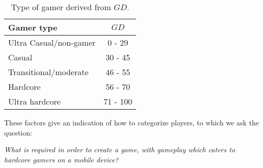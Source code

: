 \begin{table}[H]
\begin{tabular}{|l|c|}
\hline
\rowcolor[HTML]{C0C0C0} 
Gamer type             & $GD$     \\ \hline
Ultra Casual/non-gamer & 0 - 29   \\ \hline
Casual                 & 30 - 45  \\ \hline
Transitional/moderate  & 46 - 55  \\ \hline
Hardcore               & 56 - 70  \\ \hline
Ultra hardcore         & 71 - 100 \\ \hline
\end{tabular}
\caption{Type of gamer derived from $GD$.}
\label{tab:gamertype}
\end{table}

These factors give an indication of how to categorize players, to which we ask the question: 
\begin{center}\label{intro:problem_statement}
\textit{What is required in order to create a game, with gameplay which caters to hardcore gamers on a mobile device?}
\end{center}
